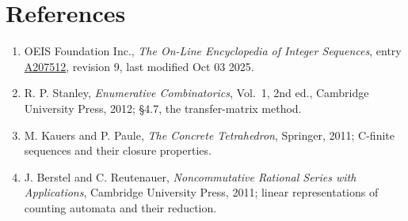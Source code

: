 \documentclass[11pt]{article}
\theoremstyle{definition}
\begin{document}
\section{References}

\begin{enumerate}

\item OEIS Foundation Inc., \emph{The On-Line Encyclopedia of Integer Sequences}, entry \href{https://oeis.org/A207512}{A207512}, revision 9, last modified Oct 03 2025.

\item R. P. Stanley, \emph{Enumerative Combinatorics}, Vol.~1, 2nd ed., Cambridge University Press, 2012; \S4.7, the transfer-matrix method.

\item M. Kauers and P. Paule, \emph{The Concrete Tetrahedron}, Springer, 2011; C-finite sequences and their closure properties.

\item J. Berstel and C. Reutenauer, \emph{Noncommutative Rational Series with Applications}, Cambridge University Press, 2011; linear representations of counting automata and their reduction.

\end{enumerate}
\end{document}
